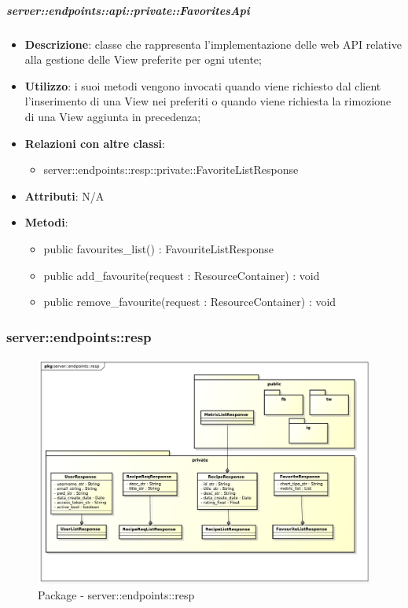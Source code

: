     \subparagraph{server::endpoints::api::private::FavoritesApi} %
    \label{subp:bdsm_app_server_endpoints_api_private_favoritesapi}
    \begin{itemize}
      \item \textbf{Descrizione}: classe che rappresenta l'implementazione delle web API relative alla gestione delle View preferite per ogni utente;
      \item \textbf{Utilizzo}: i suoi metodi vengono invocati quando viene richiesto dal client l'inserimento di una View nei preferiti o quando viene richiesta la rimozione di una View aggiunta in precedenza;
      \item \textbf{Relazioni con altre classi}:
        \begin{itemize}
          \item server::endpoints::resp::private::FavoriteListResponse
        \end{itemize}
		\item \textbf{Attributi}: N/A
		\item \textbf{Metodi}:   
			\begin{itemize}
				\item public favourites\_list() : FavouriteListResponse
				\item public add\_favourite(request : ResourceContainer) : void
				\item public remove\_favourite(request : ResourceContainer) : void
     	 \end{itemize}
      \end{itemize}

\subsubsection{server::endpoints::resp} %
\label{ssub:bdsm_app_server_endpoints_resp}
\begin{figure}[!htbp]
	\centering
	\centerline{\includegraphics[scale=0.45]{./images/server/resp.pdf}}
	\caption{Package - server::endpoints::resp}
\end{figure}

